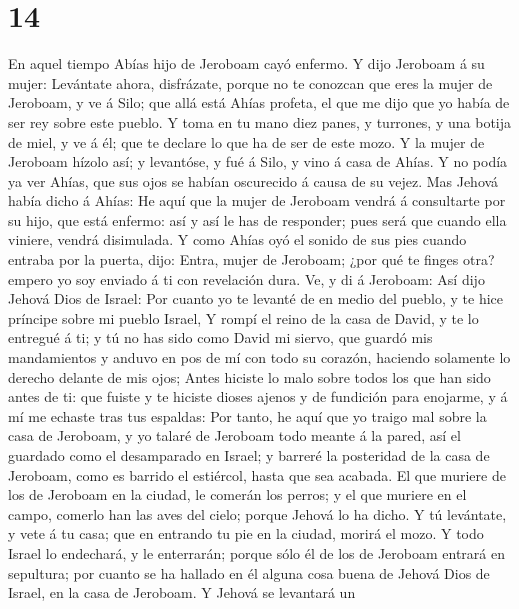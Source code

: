 \hypertarget{section-13}{%
\section{14}\label{section-13}}

 En aquel tiempo Abías hijo de Jeroboam cayó enfermo.
 Y dijo Jeroboam á su mujer: Levántate ahora, disfrázate,
porque no te conozcan que eres la mujer de Jeroboam, y ve á Silo; que
allá está Ahías profeta, el que me dijo que yo había de ser rey sobre
este pueblo.  Y toma en tu mano diez panes, y turrones, y
una botija de miel, y ve á él; que te declare lo que ha de ser de este
mozo.  Y la mujer de Jeroboam hízolo así; y levantóse, y fué
á Silo, y vino á casa de Ahías. Y no podía ya ver Ahías, que sus ojos se
habían oscurecido á causa de su vejez.  Mas Jehová había
dicho á Ahías: He aquí que la mujer de Jeroboam vendrá á consultarte por
su hijo, que está enfermo: así y así le has de responder; pues será que
cuando ella viniere, vendrá disimulada.  Y como Ahías oyó el
sonido de sus pies cuando entraba por la puerta, dijo: Entra, mujer de
Jeroboam; ¿por qué te finges otra? empero yo soy enviado á ti con
revelación dura.  Ve, y di á Jeroboam: Así dijo Jehová Dios
de Israel: Por cuanto yo te levanté de en medio del pueblo, y te hice
príncipe sobre mi pueblo Israel,  Y rompí el reino de la
casa de David, y te lo entregué á ti; y tú no has sido como David mi
siervo, que guardó mis mandamientos y anduvo en pos de mí con todo su
corazón, haciendo solamente lo derecho delante de mis ojos; 
Antes hiciste lo malo sobre todos los que han sido antes de ti: que
fuiste y te hiciste dioses ajenos y de fundición para enojarme, y á mí
me echaste tras tus espaldas:  Por tanto, he aquí que yo
traigo mal sobre la casa de Jeroboam, y yo talaré de Jeroboam todo
meante á la pared, así el guardado como el desamparado en Israel; y
barreré la posteridad de la casa de Jeroboam, como es barrido el
estiércol, hasta que sea acabada.  El que muriere de los de
Jeroboam en la ciudad, le comerán los perros; y el que muriere en el
campo, comerlo han las aves del cielo; porque Jehová lo ha dicho.
 Y tú levántate, y vete á tu casa; que en entrando tu pie
en la ciudad, morirá el mozo.  Y todo Israel lo endechará,
y le enterrarán; porque sólo él de los de Jeroboam entrará en sepultura;
por cuanto se ha hallado en él alguna cosa buena de Jehová Dios de
Israel, en la casa de Jeroboam.  Y Jehová se levantará un
